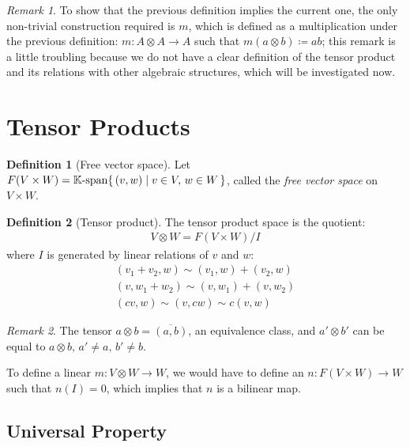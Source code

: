 \documentclass{article}
\theoremstyle{definition}
\newtheorem{Definition}{Definition}
\theoremstyle{remark}
\newtheorem*{Remark*}{Remark}
\theoremstyle{underline}
\theoremstyle{underline}
\begin{document}
	\begin{Remark*}
		To show that the previous definition implies the current one, the only non-trivial construction required is $m$, which is defined as a multiplication under the previous definition: $m \colon A \otimes A \rightarrow A$ such that $ m(a \otimes b) \coloneqq ab $; this remark is a little troubling because we do not have a clear definition of the tensor product and its relations with other algebraic structures, which will be investigated now.
	\end{Remark*}
	
	\section{Tensor Products}
	
	\begin{Definition}[Free vector space]
		Let $F(V \times W) = \mathbb K\text{-}\mathrm{span}\qty{\, (v, w) \mid v \in V,\, w \in W\, }$, called the \emph{free vector space} on $V \times W$.
	\end{Definition}
	
	\begin{Definition}[Tensor product]
		The tensor product space is the quotient:
		\begin{gather*}
		V \otimes W = F(V \times W)/I
		\end{gather*}
		where $I$ is generated by linear relations of $v$ and $w$:
		\begin{gather*}
		(v_1 + v_2, w) \sim (v_1, w) + (v_2, w) \\
		(v, w_1 + w_2) \sim (v, w_1) + (v, w_2) \\
		(cv, w) \sim (v, cw) \sim c(v, w)
		\end{gather*}
	\end{Definition}
	
	\begin{Remark*}
		The tensor $a \otimes b = \overline{(a,b)}$, an equivalence class, and $a' \otimes b'$ can be equal to $a \otimes b,\, a' \neq a, \, b' \neq b$.
	\end{Remark*}
	
	To define a linear $m \colon V \otimes W \to W$, we would have to define an $n \colon F(V \times W) \to W$ such that $n(I) = 0$, which implies that $n$ is a bilinear map. 

	\subsection{Universal Property}
\end{document}
